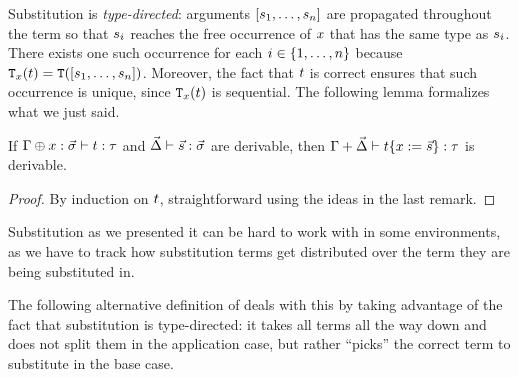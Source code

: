 \begin{remark}
Substitution is {\em type-directed}: arguments $[s_1,\hdots,s_n]$
are propagated throughout the term
so that $s_i$ reaches the free occurrence of $x$
that has the same type as $s_i$.
There exists one such occurrence for each $i \in \{1, \hdots, n\}$ because
$\mathtt{T}_{x}(t) = \mathtt{T}([s_1,\hdots,s_n])$.
Moreover, the fact that $t$ is correct ensures that such occurrence is unique,
since $\mathtt{T}_{x}(t)$ is sequential.
The following lemma formalizes what we just said.
\end{remark}


\begin{lemma}
If $\Gamma \oplus x : \vec{\sigma} \vdash t : \tau$
and $\vec{\Delta} \vdash \vec{s} : \vec{\sigma}$
are derivable,
then $\Gamma + \vec{\Delta} \vdash t\{x := \vec{s}\} : \tau$
is derivable.
\end{lemma}
\begin{proof}
By induction on $t$, straightforward using the ideas in the last remark.
\end{proof}

Substitution as we presented it can be hard to work with in some environments,
as we have to track how substitution terms get distributed over the term they are
being substituted in.

The following alternative definition of deals with this by
taking advantage of the fact that substitution is type-directed: it
takes all terms all the way down and does not split them in the application case, but rather
``picks'' the correct term to substitute in the base case.

